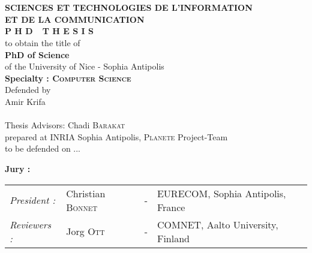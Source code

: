 \begin{titlepage}
\begin{center}
 \\
\vspace*{0.3cm}
 \\
\noindent \textbf{SCIENCES ET TECHNOLOGIES DE L'INFORMATION \\ ET DE LA COMMUNICATION} \\
\vspace*{0.5cm}
\noindent \Huge \textbf{P H D\ \ T H E S I S} \\
\vspace*{0.3cm}
\noindent \large {to obtain the title of} \\
\vspace*{0.3cm}
\noindent \LARGE \textbf{PhD of Science} \\
\vspace*{0.3cm}
\noindent \Large of the University of Nice - Sophia Antipolis \\
\noindent \Large \textbf{Specialty : \textsc{Computer Science}}\\
\vspace*{0.4cm}
\noindent \large {Defended by\\}
\noindent \LARGE Amir Krifa \\
\vspace*{0.8cm}
 \\
\vspace*{0.8cm}
\noindent \Large Thesis Advisors: Chadi \textsc{Barakat} \\
\vspace*{0.2cm}
\noindent \Large prepared at INRIA Sophia Antipolis, \textsc{Planete} Project-Team\\
\vspace*{0.2cm}
\noindent \large to be defended on ... \\
\vspace*{0.5cm}
\end{center}
\noindent \large \textbf{Jury :} \\
\begin{center}
\noindent \large 
\begin{tabular}{llcl}
\textit{President :}	& Christian \textsc{Bonnet}		& - & EURECOM, Sophia Antipolis, France\\
      \textit{Reviewers :}	& Jorg \textsc{Ott}	& - & COMNET, Aalto University, Finland\\

\end{tabular}
\end{center}
\end{titlepage}
